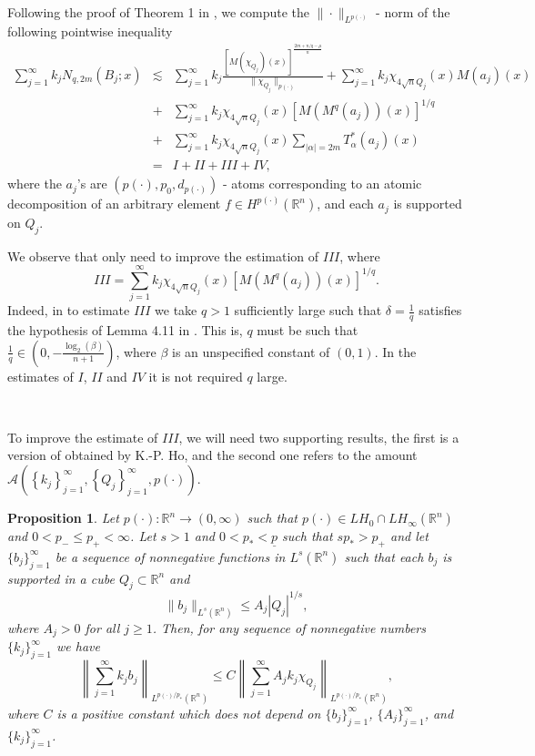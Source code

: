 \documentclass[oneside,10pt]{article}
\newtheorem{proposition}[theorem]{Proposition}
\begin{document}
\

Following the proof of Theorem 1 in \cite[p. 1026]{Rocha}, we compute the $\| \cdot \|_{L^{p(\cdot)}}$ - norm of the following pointwise inequality
\begin{eqnarray*}
\sum_{j=1}^{\infty} k_j N_{q, 2m}(B_j; x) &\lesssim& \sum_{j=1}^{\infty} k_j \frac{\left[M(\chi_{Q_j})(x) \right]^{\frac{2m + n/q - \mu}{n}}}{\| \chi_{Q_j} \|_{p(\cdot)}} + \sum_{j=1}^{\infty} k_j \chi_{4\sqrt{n}Q_j}(x) M(a_j)(x) \\
&+& \sum_{j=1}^{\infty} k_j \chi_{4 \sqrt{n} Q_j}(x) [M(M^{q}(a_j))(x)]^{1/q} \\
&+& \sum_{j=1}^{\infty} k_j \chi_{4 \sqrt{n} Q_j}(x)  \sum_{|\alpha|=2m} T^{*}_{\alpha}(a_j) (x) \\
&=& I + II + III + IV,
\end{eqnarray*}
where the $a_j$'s are $(p(\cdot),p_{0},d_{p(\cdot)})$ - atoms corresponding to an atomic decomposition of an arbitrary element 
$f \in H^{p(\cdot)}(\mathbb{R}^n)$, and each $a_j$ is supported on $Q_j$. 

We observe that only need to improve the estimation of $III$, where
\[
III = \sum_{j=1}^{\infty} k_j \chi_{4 \sqrt{n} Q_j}(x) [M(M^{q}(a_j))(x)]^{1/q}.
\] 
Indeed, in \cite{Rocha} to estimate $III$ we take $q > 1$ sufficiently large such that 
$\delta = \frac{1}{q}$ satisfies the hypothesis of Lemma 4.11 in \cite{Nakai}. This is, $q$ must be such that 
$\frac{1}{q} \in (0, -\frac{\log_{2}(\beta)}{n+1})$, where $\beta$ is an unspecified constant of $(0,1)$. In the estimates of $I$, $II$ and 
$IV$ it is not required $q$ large.

\

To improve the estimate of $III$, we will need two supporting results, the first is a version of \cite[Lemma 5.4]{Ho} obtained by K.-P. Ho, and the second one refers to the amount $\mathcal{A}\left( \left\{ k_{j}\right\}_{j=1}^{\infty },\left\{Q_{j}\right\}_{j=1}^{\infty }, 
p(\cdot)\right)$.

\begin{proposition} \label{b_k functions}
Let $p(\cdot) : \mathbb{R}^{n} \to (0, \infty)$ such that $p(\cdot) \in LH_{0} \cap LH_{\infty}(\mathbb{R}^{n})$ and 
$0 < p_{-} \leq p_{+} < \infty$. Let $s > 1$ and $0 < p_{*} < \underline{p}$ such that $s p_{*} > p_{+}$ and let 
$\{ b_j \}_{j=1}^{\infty}$ be a sequence of nonnegative functions in $L^{s}(\mathbb{R}^{n})$ such that each $b_j$ is supported 
in a cube $Q_j \subset \mathbb{R}^{n}$ and
\begin{equation} \label{bks}
\| b_j \|_{L^{s}(\mathbb{R}^{n})} \leq A_j |Q_j|^{1/s},
\end{equation}
where $A_j >0$ for all $j \geq 1$. Then, for any sequence of nonnegative numbers $\{ k_j \}_{j=1}^{\infty}$ we have
\[
\left\| \sum_{j=1}^{\infty} k_j b_j \right\|_{L^{p(\cdot)/p_{*}}(\mathbb{R}^{n})} \leq C \left\| \sum_{j=1}^{\infty} A_j k_j 
\chi_{Q_j} \right\|_{L^{p(\cdot)/p_{*}}(\mathbb{R}^{n})},
\]
where $C$ is a positive constant which does not depend on $\{ b_j \}_{j=1}^{\infty}$, $\{ A_j \}_{j=1}^{\infty}$, and 
$\{ k_j \}_{j=1}^{\infty}$.
\end{proposition}
\end{document}
